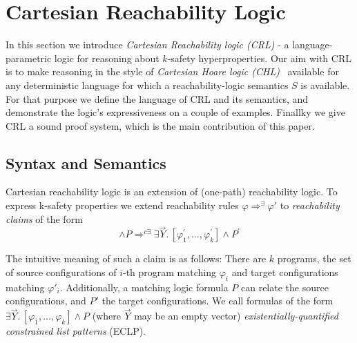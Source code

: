 \section{Cartesian Reachability Logic}
In this section we introduce \emph{Cartesian Reachability logic (CRL)} - a
language-parametric logic for reasoning about $k$-safety hyperproperties.  Our
aim with CRL is to make reasoning in the style of \emph{Cartesian Hoare logic
  (CHL)}~\cite{SousaD16} available for any deterministic language for which a
reachability-logic semantics $S$ is available.  For that purpose we define the
language of CRL and its semantics, and demonstrate the logic's expressiveness
on a couple of examples.  Finallky we give CRL a sound proof system, which is the
main contribution of this paper.


\subsection{Syntax and Semantics}

Cartesian reachability logic is an extension of (one-path) reachability
logic. To express k-safety properties we extend reachability rules $\varphi
\Rightarrow^{\exists} \varphi'$ to  \emph{reachability claims} of the form
\begin{equation*}
  [\varphi_1,\ldots,\varphi_k] \land P
  \Rightarrow^{c\exists} \exists \vec{Y}.\, [\varphi^\prime_1,\ldots,\varphi^\prime_k] \land P^\prime
\end{equation*}

The intuitive meaning of such a claim is as follows: There are $k$ programs,
the set of source configurations of $i$-th program matching $\varphi_i$ and
target configurations matching $\varphi'_i$. Additionally, a matching logic
formula $P$ can relate the source configurations, and $P'$ the target
configurations. We call formulas of the form
$ \exists \vec{Y}.\,[\varphi_1,\ldots,\varphi_k] \land P$ (where $\vec{Y}$ may
be an empty vector) \emph{existentially-quantified constrained list patterns}
(ECLP).


